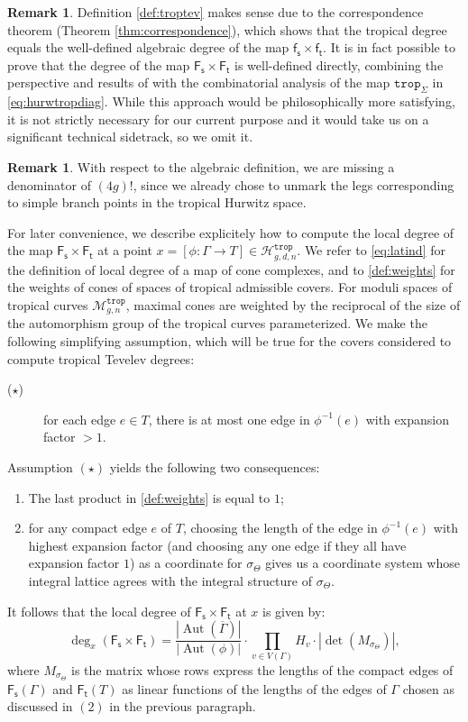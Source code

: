 \documentclass[11pt,reqno]{amsart}
\theoremstyle{definition}
\newtheorem{remark}[theorem]{Remark}
\newcommand\trop{{\mathtt{trop}}}
\DeclareMathOperator{\Aut}{\mathrm Aut}
\newcommand\Mgn[1]{\mathcal M_{#1}}
\newcommand\Hur[1]{\mathcal H_{#1}}
\newcommand{\Ft}{\mathsf{F_t}}
\newcommand{\Fs}{\mathsf{F_s}}
\newcommand{\ft}{\mathsf{f_t}}
\newcommand{\fs}{\mathsf{f_s}}
\begin{document}
\begin{remark}
Definition \ref{def:troptev} makes sense due to the correspondence theorem (Theorem \ref{thm:correspondence}), which shows that the tropical degree equals the well-defined algebraic degree of the map $\fs\times \ft$.
It  is in fact possible to prove that the  degree of the map $\Fs \times \Ft$ is well-defined directly, combining the perspective and results of \cite{psi-classes, CG:tpsi} with the combinatorial analysis of the map $\trop_\Sigma$ in \eqref{eq:hurwtropdiag}. While this approach would be philosophically more satisfying, it is not strictly necessary for our current purpose and it would take us on a significant technical sidetrack, so we omit it.
\end{remark}

\begin{remark}
 With respect to the algebraic definition, we are missing a denominator of $(4g)!$, since we already chose to unmark the legs corresponding to simple branch points in the tropical Hurwitz space.
\end{remark}

For later convenience, we describe explicitely how to compute the local degree of the map $\Fs\times \Ft$ at a point $x = [\phi:\Gamma\to T]\in \Hur{g,d,n}^\trop$. We refer to \eqref{eq:latind} for the definition of local degree of a map of cone complexes, and  to \eqref{def:weights} for the weights of cones of spaces of tropical admissible covers. For moduli spaces of tropical curves $\Mgn{g,n}^\trop$, maximal cones are weighted by the reciprocal of the size of the automorphism group of the tropical curves parameterized. 
We make the following simplifying assumption, which will be true for the covers considered to compute tropical Tevelev degrees:
\begin{description}
    \item[($\star$)] for each edge $e\in T$, there is at most one edge in $\phi^{-1}(e)$ with expansion factor $>1$.
\end{description}
Assumption $(\star)$ yields the following two consequences:
\begin{enumerate}
    \item The last product in \eqref{def:weights} is  equal to $1$;
    \item  for any compact edge $e$ of $T$, choosing the length of the edge in  $\phi^{-1}(e)$ with highest expansion factor (and choosing any one edge if they all have expansion factor $1$) as a coordinate for $\sigma_\Theta$ gives us a coordinate system whose integral lattice agrees with the integral structure of $\sigma_\Theta$.
 \end{enumerate}
 It follows that the local degree of $\Fs\times \Ft$ at  $x$ is given by:
 \begin{equation}\label{eq:locdegforlater}
     \deg_x (\Fs\times \Ft) =  \frac{|\Aut(\overline{\Gamma})|}{|\Aut(\phi)|}\cdot \prod_{v\in V(\Gamma)} H_v \cdot \left| \det(M_{\sigma_\Theta}) \right|,
 \end{equation}
 where $M_{\sigma_\Theta}$ is the matrix whose rows express the lengths of the compact edges of $\Fs(\Gamma)$ and $\Ft(T)$ as linear functions of the lengths of the edges of $\Gamma$ chosen as discussed in $(2)$ in the previous paragraph.
\end{document}
